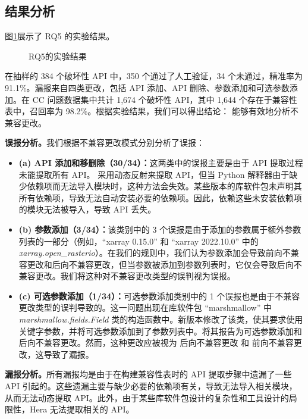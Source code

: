 \subsection{结果分析}
图\ref{fig:RQ5}展示了 RQ5 的实验结果。
\begin{figure}[htbp]
	\centering
	\subfloat[分析不兼容更改的精确率]{
		\texttt{[image: RQ2-1]}
		\label{fig:RQ5-1}
	}\hspace{4em}
	\subfloat[分析不兼容更改的召回率]{
		\texttt{[image: RQ2-2]}
		\label{fig:RQ5-2}
	}
	\caption{RQ5的实验结果}
	\label{fig:RQ5}
\end{figure}
在抽样的 384 个破坏性 API 中，350 个通过了人工验证，34 个未通过，精准率为 91.1\%。漏报来自四类更改，包括 API 添加、API 删除、参数添加和可选参数添加。在 CC 问题数据集中共计 1,674 个破坏性 API，其中 1,644 个存在于兼容性表中，召回率为 98.2\%。根据实验结果，我们可以得出结论：\tool{} 能够有效地分析不兼容更改。

\textbf{误报分析。}我们根据不兼容更改模式分别分析了误报：
\begin{itemize}
	\item \textbf{(a) API 添加和移删除（30/34）：}这两类中的误报主要是由于 API 提取过程未能提取所有 API。\tool{} 采用动态反射来提取 API，但当 Python 解释器由于缺少依赖项而无法导入模块时，这种方法会失效。某些版本的库软件包未声明其所有依赖项，导致无法自动安装必要的依赖项。因此，依赖这些未安装依赖项的模块无法被导入，导致 API 丢失。
	\item \textbf{ (b) 参数添加（3/34）：}该类别中的 3 个误报是由于添加的参数属于额外参数列表的一部分（例如，“xarray 0.15.0” 和 “xarray 2022.10.0”  中的 \textit{xarray.open\_rasterio}）。在我们的规则中，我们认为参数添加会导致前向不兼容更改和后向不兼容更改，但当参数被添加到参数列表时，它仅会导致后向不兼容更改。我们将这种对不兼容更改类型的误判视为误报。
	\item \textbf{ (c) 可选参数添加（1/34）：}可选参数添加类别中的 1 个误报也是由于不兼容更改类型的误判导致的。这一问题出现在库软件包 “marshmallow”  中\textit{ marshmallow.fields.Field} 类的构造函数中。新版本修改了该类，使其要求使用关键字参数，并将可选参数添加到了参数列表中。\tool{}将其报告为可选参数添加和后向不兼容更改。然而，这种更改应被视为 后向不兼容更改 和 前向不兼容更改，这导致了漏报。
\end{itemize}

\textbf{漏报分析。}所有漏报均是由于在构建兼容性表时的 API 提取步骤中遗漏了一些 API 引起的。这些遗漏主要与缺少必要的依赖项有关，导致无法导入相关模块，从而无法动态提取 API。此外，由于某些库软件包设计的复杂性和工具设计的局限性，Hera 无法提取相关的 API。

